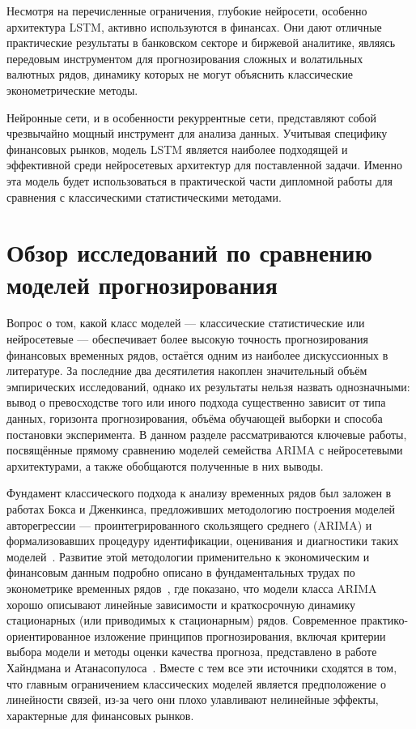 Несмотря на перечисленные ограничения, глубокие нейросети, особенно архитектура LSTM, активно используются в финансах. Они дают отличные практические результаты в банковском секторе и биржевой аналитике, являясь передовым инструментом для прогнозирования сложных и волатильных валютных рядов, динамику которых не могут объяснить классические эконометрические методы.

Нейронные сети, и в особенности рекуррентные сети, представляют собой чрезвычайно мощный инструмент для анализа данных. Учитывая специфику финансовых рынков, модель LSTM является наиболее подходящей и эффективной среди нейросетевых архитектур для поставленной задачи. Именно эта модель будет использоваться в практической части дипломной работы для сравнения с классическими статистическими методами.

\section{Обзор исследований по сравнению моделей прогнозирования}
Вопрос о том, какой класс моделей — классические статистические или нейросетевые — обеспечивает более высокую точность прогнозирования финансовых временных рядов, остаётся одним из наиболее дискуссионных в литературе. За последние два десятилетия накоплен значительный объём эмпирических исследований, однако их результаты нельзя назвать однозначными: вывод о превосходстве того или иного подхода существенно зависит от типа данных, горизонта прогнозирования, объёма обучающей выборки и способа постановки эксперимента. В данном разделе рассматриваются ключевые работы, посвящённые прямому сравнению моделей семейства ARIMA с нейросетевыми архитектурами, а также обобщаются полученные в них выводы.
 
Фундамент классического подхода к анализу временных рядов был заложен в работах Бокса и Дженкинса, предложивших методологию построения моделей авторегрессии — проинтегрированного скользящего среднего (ARIMA) и формализовавших процедуру идентификации, оценивания и диагностики таких моделей~\cite{box2016}. Развитие этой методологии применительно к экономическим и финансовым данным подробно описано в фундаментальных трудах по эконометрике временных рядов~\cite{hamilton1994, enders2015}, где показано, что модели класса ARIMA хорошо описывают линейные зависимости и краткосрочную динамику стационарных (или приводимых к стационарным) рядов. Современное практико-ориентированное изложение принципов прогнозирования, включая критерии выбора модели и методы оценки качества прогноза, представлено в работе Хайндмана и Атанасопулоса~\cite{hyndman2021}. Вместе с тем все эти источники сходятся в том, что главным ограничением классических моделей является предположение о линейности связей, из-за чего они плохо улавливают нелинейные эффекты, характерные для финансовых рынков.
 
